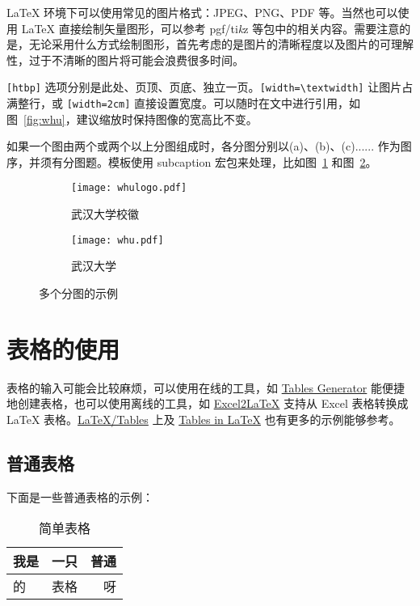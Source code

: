 \LaTeX{} 环境下可以使用常见的图片格式：JPEG、PNG、PDF 等。当然也可以使用 \LaTeX{} 直接绘制矢量图形，可以参考 pgf/ti\emph{k}z 等包中的相关内容。需要注意的是，无论采用什么方式绘制图形，首先考虑的是图片的清晰程度以及图片的可理解性，过于不清晰的图片将可能会浪费很多时间。

\verb|[htbp]| 选项分别是此处、页顶、页底、独立一页。\verb|[width=\textwidth]| 让图片占满整行，或 \verb|[width=2cm]| 直接设置宽度。可以随时在文中进行引用，如图~\ref{fig:whu}，建议缩放时保持图像的宽高比不变。

如果一个图由两个或两个以上分图组成时，各分图分别以(a)、(b)、(c)...... 作为图序，并须有分图题。模板使用 subcaption 宏包来处理，比如图~\ref{fig:subfig-a} 和图~\ref{fig:subfig-b}。

\begin{figure}[h]
  \centering
  \begin{subfigure}{0.2\textwidth}
    \texttt{[image: whulogo.pdf]}
    \caption{武汉大学校徽}
    \label{fig:subfig-a}
  \end{subfigure}\qquad
  \begin{subfigure}{0.7\textwidth}
    \texttt{[image: whu.pdf]}
    \caption{武汉大学}
    \label{fig:subfig-b}
  \end{subfigure}
  \caption{多个分图的示例}
  \label{fig:multi-image}
\end{figure}

\section{表格的使用}
表格的输入可能会比较麻烦，可以使用在线的工具，如 \href{https://www.tablesgenerator.com/}{Tables Generator} 能便捷地创建表格，也可以使用离线的工具，如 \href{https://ctan.org/pkg/excel2latex}{Excel2LaTeX} 支持从 Excel 表格转换成 \LaTeX{} 表格。\href{https://en.wikibooks.org/wiki/LaTeX/Tables}{LaTeX/Tables} 上及 \href{https://www.tug.org/pracjourn/2007-1/mori/mori.pdf}{Tables in LaTeX} 也有更多的示例能够参考。

\subsection{普通表格}
下面是一些普通表格的示例：

\begin{table}[ht]
  \centering
  \caption{简单表格}
  \label{tab:1}
  \begin{tabular}{|l|c|r|}
    \hline
    我是 & 一只 & 普通 \\
    \hline
    的   & 表格 & 呀   \\
    \hline
  \end{tabular}
\end{table}

